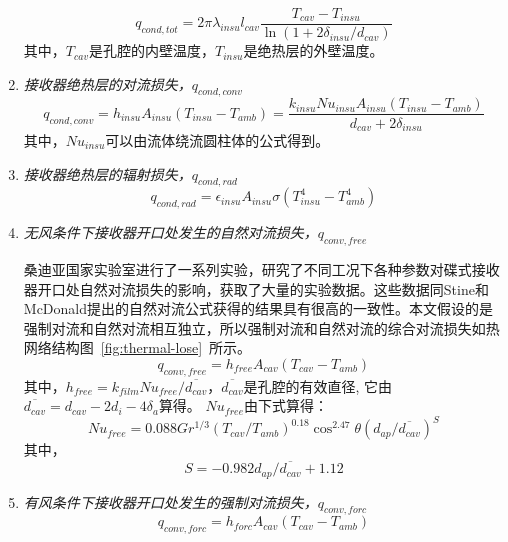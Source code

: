 \begin{enumerate}[label=(\arabic*)]
  \begin{equation}
q_{cond,tot}=2\pi\lambda_{insu}l_{cav}\dfrac{T_{cav}-T_{insu}}{\ln(1 + 2\delta_{insu}/d_{cav})}
    \end{equation}  
    其中，$T_{cav}$是孔腔的内壁温度，$T_{insu}$是绝热层的外壁温度。

  \item \emph{接收器绝热层的对流损失，$q_{cond,conv}$}  
  \begin{equation}
	q_{cond,conv}=h_{insu}A_{insu}(T_{insu}-T_{amb})
	=\dfrac{k_{insu}Nu_{insu}A_{insu}(T_{insu}-T_{amb})}{d_{cav}+2\delta_{insu}}
\end{equation}
其中，$Nu_{insu}$可以由流体绕流圆柱体的公式得到\cite{Churchill1977}。

  \item \emph{接收器绝热层的辐射损失，$q_{cond,rad}$}  
  \begin{equation}
	q_{cond,rad}=\epsilon_{insu}A_{insu}\sigma(T_{insu}^4 - T_{amb}^4)
\end{equation}
  \item \emph{无风条件下接收器开口处发生的自然对流损失，$q_{conv,free}$}
    
  桑迪亚国家实验室进行了一系列实验，研究了不同工况下各种参数对碟式接收器开口处自然对流损失的影响，获取了大量的实验数据\cite{Ma1993}。这些数据同Stine和McDonald提出的自然对流公式获得的结果具有很高的一致性。本文假设的是强制对流和自然对流相互独立，所以强制对流和自然对流的综合对流损失如热网络结构图~\ref{fig:thermal-lose}~所示。
  \begin{equation}
	q_{conv,free} = h_{free}A_{cav}(T_{cav}-T_{amb})
\end{equation}
其中，$h_{free}=k_{film}Nu_{free}/\overline{d_{cav}}$，$\overline{d_{cav}}$是孔腔的有效直径, 它由$\overline{d_{cav}}=d_{cav}-2d_i-4 \delta_a$算得。
$Nu_{free}由下式算得$\cite{Jilte2013b}：
\begin{equation}
	Nu_{free} = 0.088Gr^{1/3}(T_{cav}/T_{amb})^{0.18}\cos^{2.47}\theta (d_{ap}/\overline{d_{cav}})^S
\end{equation}
其中，
\begin{equation}
	S = -0.982d_{ap}/\overline{d_{cav}} + 1.12
\end{equation}
  
  \item \emph{有风条件下接收器开口处发生的强制对流损失，$q_{conv,forc}$}  
  \begin{equation}
	q_{conv,forc} = h_{forc}A_{cav}(T_{cav}-T_{amb})
\end{equation}


\end{enumerate}

